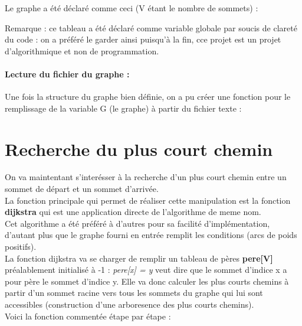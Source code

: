 \documentclass[a4]{article}
\begin{document}
			Le graphe a été déclaré comme ceci (V étant le nombre de sommets) :
			
			Remarque : ce tableau a été déclaré comme variable globale par soucis de clareté du code : on a préféré le garder ainsi 
			puisqu'à la fin, cce projet est un projet d'algorithmique et non de programmation.
			
			\paragraph{Lecture du fichier du graphe :\\}
			Une fois la structure du graphe bien définie, on a pu créer une fonction pour le remplissage de la variable G (le graphe) à partir du
			fichier texte :
			
	
	\section{Recherche du plus court chemin}
			On va maintentant s'interésser à la recherche d'un plus court chemin entre un sommet de départ et un sommet d'arrivée.\\
			La fonction principale qui permet de réaliser cette manipulation est la fonction \textbf{dijkstra} qui est une application 
			directe de l'algorithme de meme nom.\\
			Cet algorithme a été préféré à d'autres pour sa facilité d'implémentation, d'autant plus que le graphe fourni en entrée remplit les 
			conditions (arcs de poids positifs).\\
			La fonction dijkstra va se charger de remplir un tableau de pères \textbf{pere[V]} préalablement initialisé à -1 : 
			\textit{pere[x] = y} veut dire que le sommet d'indice x a pour père le sommet d'indice y. Elle va donc calculer les plus courts chemins 
			à partir d'un sommet racine vers tous les sommets du graphe qui lui sont accessibles (construction d'une arboresence des plus courts 
			chemins).\\
			Voici la fonction commentée étape par étape :
			
			
\end{document}
